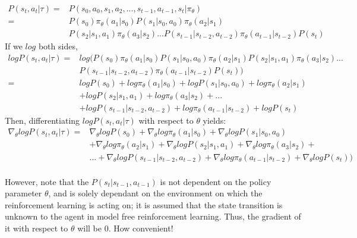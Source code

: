 \documentclass[letterpaper,11pt]{article}
\begin{document}
$$
\begin{aligned}
    P(s_{t}, a_{t} | \tau) ={}& P(s_{0}, a_{0}, s_{1}, a_{2}, ..., s_{t-1}, a_{t-1}, s_{t} | \pi_{\theta}) \\
                           ={}& P(s_{0}) \pi_{\theta}(a_{1} | s_{0}) P(s_{1} | s_{0}, a_{0}) \pi_{\theta}(a_{2} | s_{1}) \\
& P(s_{2} | s_{1}, a_{1}) \pi_{\theta}(a_{3} | s_{2}) ... P(s_{t-1} | s_{t-2}, a_{t-2}) \pi_{\theta}(a_{t-1} | s_{t-2}) P(s_{t}) 
\end{aligned}
$$
\vspace{0.2cm}
\noindent If we $log$ both sides, \\
\vspace{-0.2cm}
$$
\begin{aligned}
    log P(s_{t}, a_{t} | \tau)  ={}& log (P(s_{0}) \pi_{\theta}(a_{1} | s_{0}) P(s_{1} | s_{0}, a_{0}) \pi_{\theta}(a_{2} | s_{1}) P(s_{2} | s_{1}, a_{1}) \pi_{\theta}(a_{3} | s_{2}) ... \\
& P(s_{t-1} | s_{t-2}, a_{t-2}) \pi_{\theta}(a_{t-1} | s_{t-2}) P(s_{t})) \\ ={}& log P(s_{0}) + log \pi_{\theta}(a_{1} | s_{0}) + log P(s_{1} | s_{0}, a_{0}) + log \pi_{\theta}(a_{2} | s_{1})\\
& + log P(s_{2} | s_{1}, a_{1}) + log \pi_{\theta}(a_{3} | s_{2}) + ... \\
& + log P(s_{t-1} | s_{t-2}, a_{t-2}) + log \pi_{\theta}(a_{t-1} | s_{t-2}) + log P(s_{t})
\end{aligned}
$$
\vspace{0.2cm}
\noindent Then,  differentiating $log P(s_{t}, a_{t} | \tau)$ with respect to $\theta$ yields: \\
\vspace{-0.15cm}
$$
\begin{aligned}
    \nabla_{\theta} log P(s_{t}, a_{t} | \tau)  ={}& \nabla_{\theta} log P(s_{0}) + \nabla_{\theta} log \pi_{\theta}(a_{1} | s_{0}) + \nabla_{\theta} log P(s_{1} | s_{0}, a_{0}) \\
& + \nabla_{\theta} log \pi_{\theta}(a_{2} | s_{1}) + \nabla_{\theta} log P(s_{2} | s_{1}, a_{1}) + \nabla_{\theta} log \pi_{\theta}(a_{3} | s_{2}) + \\
& ... + \nabla_{\theta} log P(s_{t-1} | s_{t-2}, a_{t-2}) + \nabla_{\theta} log \pi_{\theta}(a_{t-1} | s_{t-2}) + \nabla_{\theta} log P(s_{t})) \\
\end{aligned}
$$

However, note that the $P(s_{t} | s_{t-1}, a_{t-1})$ is not dependent on the policy parameter $\theta$, and is solely dependant on the environment on which the reinforcement learning is acting on; it is assumed that the state transition is unknown to the agent in model free reinforcement learning. Thus, the gradient of it with respect to $\theta$ will be 0. How convenient! 
\end{document}
